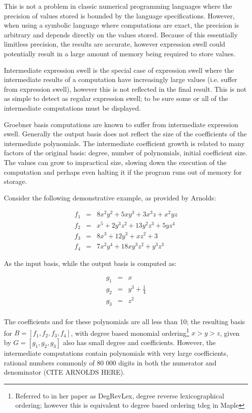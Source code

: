 \documentclass[letterpaper,12pt,titlepage,oneside,final]{book}
\begin{document}
This is not a problem in classic numerical programming languages where the precision of values stored is bounded by the language specifications.  However, when using a symbolic language where computations are exact, the precision is arbitrary and depends directly on the values stored.  Because of this essentially limitless precision, the results are accurate, however expression swell could potentially result in a large amount of memory being required to store values.

Intermediate expression swell is the special case of expression swell where the intermediate results of a computation have increasingly large values (i.e. suffer from expression swell), however this is not reflected in the final result.  This is not as simple to detect as regular expression swell; to be sure some or all of the intermediate computations must be displayed. 

Groebner basis computations are known to suffer from intermediate expression swell.  Generally the output basis does not reflect the size of the coefficients of the intermediate polynomials.  The intermediate coefficient growth is related to many factors of the original basis: degree, number of polynomials, initial coefficient size.  The values can grow to impractical size, slowing down the execution of the computation and perhaps even halting it if the program runs out of memory for storage.  

Consider the following demonstrative example, as provided by Arnolds:

\begin{eqnarray*}
  f_1 &=& 8x^2y^2 + 5xy^3 + 3x^3z + x^2yz\\
  f_2 &=& x^5 + 2y^3z^2 + 13y^2z^3 + 5yz^4\\ 
  f_3 &=& 8x^3 + 12y^3 + xz^2 + 3\\
  f_4 &=& 7x^2y^4 + 18xy^3z^2 + y^3z^3
\end{eqnarray*} 

As the input basis, while the output basis is computed as:

\begin{eqnarray*}
  g_1 &=& x\\
  g_2 &=& y^3 + \frac{1}{4}\\ 
  g_3 &=& z^2\\
\end{eqnarray*} 

The coefficients and for these polynomials are all less than 10; the resulting basis for ${B = [f_1, f_2, f_3, f_4]}$, with degree based monomial ordering\footnote{Referred to in her paper as DegRevLex, degree reverse lexicographical ordering; however this is equivalent to degree based ordering tdeg in Maple} ${x > y > z}$, given by ${G = [g_1, g_2, g_3]}$ also has small degree and coefficients.  However, the intermediate computations contain polynomials with very large coefficients, rational numbers commonly of 80 000 digits in both the numerator and denominator (CITE ARNOLDS HERE).  
\end{document}
